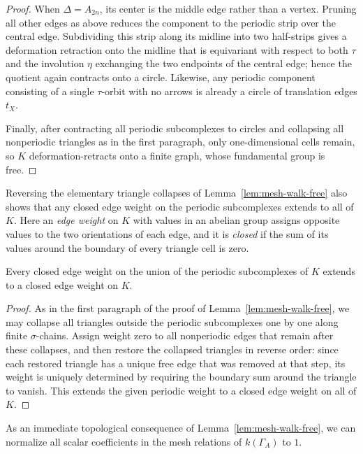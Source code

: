 \begin{proof}
When $\Delta=A_{2n}$, its center is the middle edge rather than a vertex.
Pruning all other edges as above reduces the component to the periodic strip
over the central edge. Subdividing this strip along its midline into two
half-strips gives a deformation retraction onto the midline that is
equivariant with respect to both $\tau$ and the involution $\eta$ exchanging
the two endpoints of the central edge; hence the quotient again contracts
onto a circle. Likewise, any periodic component consisting of a single
$\tau$-orbit with no arrows is already a circle of translation edges $t_X$.

Finally, after contracting all periodic subcomplexes to circles and
collapsing all nonperiodic triangles as in the first paragraph, only
one-dimensional cells remain, so $K$ deformation-retracts onto a finite
graph, whose fundamental group is free.
\end{proof}

Reversing the elementary triangle collapses of Lemma~\ref{lem:mesh-walk-free}
also shows that any closed edge weight on the periodic subcomplexes extends
to all of $K$. Here an \emph{edge weight} on $K$ with values in an abelian
group assigns opposite values to the two orientations of each edge, and it
is \emph{closed} if the sum of its values around the boundary of every
triangle cell is zero.

\begin{lemma}
\label{lem:periodic-weight-extension}
Every closed edge weight on the union of the periodic subcomplexes of $K$
extends to a closed edge weight on $K$.
\end{lemma}
\begin{proof}
As in the first paragraph of the proof of Lemma~\ref{lem:mesh-walk-free}, we
may collapse all triangles outside the periodic subcomplexes one by one along
finite $\sigma$-chains. Assign weight zero to all nonperiodic edges that
remain after these collapses, and then restore the collapsed triangles in
reverse order: since each restored triangle has a unique free edge that was
removed at that step, its weight is uniquely determined by requiring the
boundary sum around the triangle to vanish. This extends the given periodic
weight to a closed edge weight on all of $K$.
\end{proof}

As an immediate topological consequence of Lemma~\ref{lem:mesh-walk-free}, we
can normalize all scalar coefficients in the mesh relations of $k(\Gamma_A)$
to $1$.

